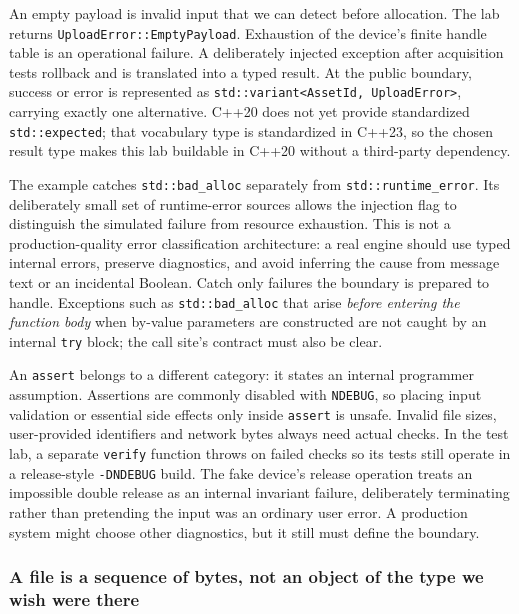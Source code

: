 An empty payload is invalid input that we can detect before allocation. The lab returns \texttt{UploadError::EmptyPayload}. Exhaustion of the device's finite handle table is an operational failure. A deliberately injected exception after acquisition tests rollback and is translated into a typed result. At the public boundary, success or error is represented as \texttt{std::variant\textless{}AssetId,\ UploadError\textgreater{}}, carrying exactly one alternative. C++20 does not yet provide standardized \texttt{std::expected}; that vocabulary type is standardized in C++23, so the chosen result type makes this lab buildable in C++20 without a third-party dependency.

The example catches \texttt{std::bad\_alloc} separately from \texttt{std::runtime\_error}. Its deliberately small set of runtime-error sources allows the injection flag to distinguish the simulated failure from resource exhaustion. This is not a production-quality error classification architecture: a real engine should use typed internal errors, preserve diagnostics, and avoid inferring the cause from message text or an incidental Boolean. Catch only failures the boundary is prepared to handle. Exceptions such as \texttt{std::bad\_alloc} that arise \emph{before entering the function body} when by-value parameters are constructed are not caught by an internal \texttt{try} block; the call site's contract must also be clear.

An \texttt{assert} belongs to a different category: it states an internal programmer assumption. Assertions are commonly disabled with \texttt{NDEBUG}, so placing input validation or essential side effects only inside \texttt{assert} is unsafe. Invalid file sizes, user-provided identifiers and network bytes always need actual checks. In the test lab, a separate \texttt{verify} function throws on failed checks so its tests still operate in a release-style \texttt{-DNDEBUG} build. The fake device's release operation treats an impossible double release as an internal invariant failure, deliberately terminating rather than pretending the input was an ordinary user error. A production system might choose other diagnostics, but it still must define the boundary.

\subsubsection{A file is a sequence of bytes, not an object of the type we wish were there}\label{a-file-is-a-sequence-of-bytes-not-an-object-of-the-type-we-wish-were-there}


